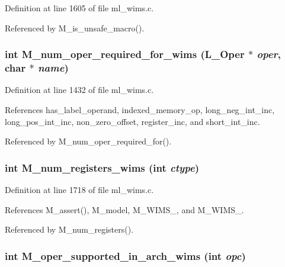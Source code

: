 Definition at line 1605 of file ml\_\-wims.c.

Referenced by M\_\-is\_\-unsafe\_\-macro().
\subsubsection{\setlength{\rightskip}{0pt plus 5cm}int M\_\-num\_\-oper\_\-required\_\-for\_\-wims (L\_\-Oper $\ast$ {\em oper}, char $\ast$ {\em name})}\label{ml__wims_8c_70ac477eaa53977691c3857c822fd941}




Definition at line 1432 of file ml\_\-wims.c.

References has\_\-label\_\-operand, indexed\_\-memory\_\-op, long\_\-neg\_\-int\_\-inc, long\_\-pos\_\-int\_\-inc, non\_\-zero\_\-offset, register\_\-inc, and short\_\-int\_\-inc.

Referenced by M\_\-num\_\-oper\_\-required\_\-for().
\subsubsection{\setlength{\rightskip}{0pt plus 5cm}int M\_\-num\_\-registers\_\-wims (int {\em ctype})}\label{ml__wims_8c_86ab7de92232fd31bc1014e5398b513b}




Definition at line 1718 of file ml\_\-wims.c.

References M\_\-assert(), M\_\-model, M\_\-WIMS\_, and M\_\-WIMS\_.

Referenced by M\_\-num\_\-registers().
\subsubsection{\setlength{\rightskip}{0pt plus 5cm}int M\_\-oper\_\-supported\_\-in\_\-arch\_\-wims (int {\em opc})}\label{ml__wims_8c_f14f1f8edd6e62703b8dfc729724840a}




